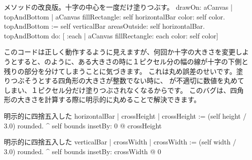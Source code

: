 \documentclass[a4paper,10pt,twoside]{book}
\begin{document}
\begin{method}{メソッドの改良版。十字の中心を一度だけ塗りつぶす。}
drawOn: aCanvas 
	| topAndBottom |
	aCanvas fillRectangle: self horizontalBar color: self color.
	topAndBottom := self verticalBar areasOutside: self horizontalBar. 
	topAndBottom do: [ :each | aCanvas fillRectangle: each color: self color]
\end{method}

このコードは正しく動作するように見えますが、何回か十字の大きさを変更しようとすると、のように、ある大きさの時に１ピクセル分の幅の線が十字の下側と残りの部分を分けてしまうことに気づきます。
これは丸め誤差のせいです。塗りつぶそうとする四角形の大きさが整数でない時に、
が不適切に数値を丸めてしまい、１ピクセル分だけ塗りつぶされなくなるからです。
このバグは、四角形の大きさを計算する際に明示的に丸めることで解決できます。

\begin{method}{明示的に四捨五入した}
horizontalBar
	| crossHeight |
	crossHeight := (self height / 3.0) rounded.
	^ self bounds insetBy: 0 @ crossHeight
\end{method}

\begin{method}{明示的に四捨五入した}
verticalBar
	| crossWidth |
	crossWidth := (self width / 3.0) rounded.
	^ self bounds insetBy: crossWidth @ 0
\end{method}






\end{document}
